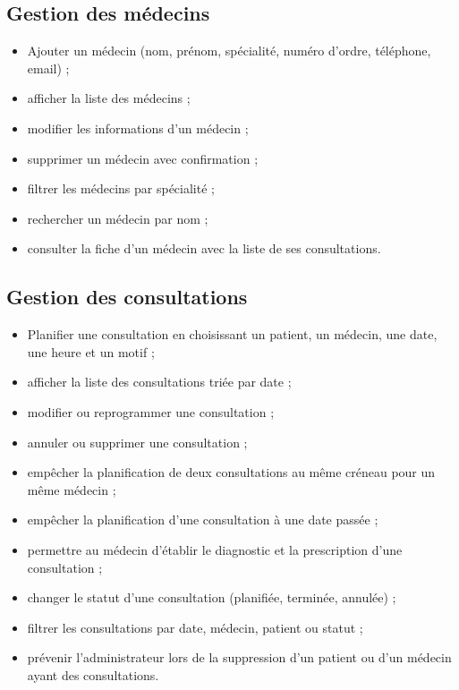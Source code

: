 \subsection{Gestion des médecins}

\begin{itemize}
    \item Ajouter un médecin (nom, prénom, spécialité, numéro d'ordre, téléphone, email) ;
    \item afficher la liste des médecins ;
    \item modifier les informations d'un médecin ;
    \item supprimer un médecin avec confirmation ;
    \item filtrer les médecins par spécialité ;
    \item rechercher un médecin par nom ;
    \item consulter la fiche d'un médecin avec la liste de ses consultations.
\end{itemize}

\subsection{Gestion des consultations}

\begin{itemize}
    \item Planifier une consultation en choisissant un patient, un médecin, une date, une heure et un motif ;
    \item afficher la liste des consultations triée par date ;
    \item modifier ou reprogrammer une consultation ;
    \item annuler ou supprimer une consultation ;
    \item empêcher la planification de deux consultations au même créneau pour un même médecin ;
    \item empêcher la planification d'une consultation à une date passée ;
    \item permettre au médecin d'établir le diagnostic et la prescription d'une consultation ;
    \item changer le statut d'une consultation (planifiée, terminée, annulée) ;
    \item filtrer les consultations par date, médecin, patient ou statut ;
    \item prévenir l'administrateur lors de la suppression d'un patient ou d'un médecin ayant des consultations.
\end{itemize}


